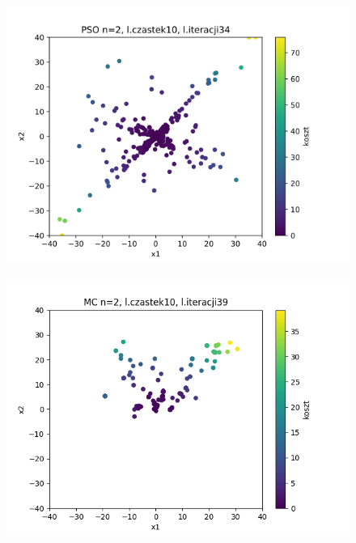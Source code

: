 \documentclass[11pt, a4paper, oneside]{article}
\begin{document}

\begin{figure}[H]
\centering
\begin{minipage}[b]{\dimexpr.5\textwidth-1em}
  \centering
  \includegraphics[width=1\linewidth]{grafiki/Wykresy2d/PSO_zad1_scatter_allIters.png}
  \label{fig:położeniaWszystkich:PSO1}
\end{minipage} \hfill
\begin{minipage}[b]{\dimexpr.5\textwidth-1em}
  \centering
  \includegraphics[width=1\linewidth]{grafiki/Wykresy2d/MC_Zad1_scatter_allIters.png}
  \label{fig:położeniaWszystkich:MC1}
\end{minipage}
\end{figure}
\end{document}

